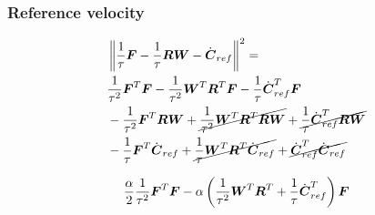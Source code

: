 \subsubsection{Reference velocity}
\begin{equation*}
\begin{split}
    &\norm{\frac{1}{\tau} \FD - \frac{1}{\tau} \M{R} \V{W} - \cVel_{ref}}^2 = \\
    &
    \frac{1}{\tau^2} \FD^T \FD
    - \frac{1}{\tau^2} \V{W}^T \M{R}^T \FD
    - \frac{1}{\tau} \cVel_{ref}^T \FD\\
    &
    - \frac{1}{\tau^2} \FD^T \M{R} \V{W}
    + \cancel{\frac{1}{\tau^2} \V{W}^T \M{R}^T \M{R} \V{W}}
    + \cancel{\frac{1}{\tau} \cVel_{ref}^T \M{R} \V{W}}\\
    &
    - \frac{1}{\tau} \FD^T \cVel_{ref}
    + \cancel{\frac{1}{\tau} \V{W}^T \M{R}^T \cVel_{ref}}
    + \cancel{\cVel_{ref}^T \cVel_{ref}}\\
\end{split}
\end{equation*}

\begin{equation*}
    \frac{\alpha}{2} \frac{1}{\tau^2} \FD^T \FD
    -  
    \alpha 
    \left(
        \frac{1}{\tau^2} \V{W}^T \M{R}^T
        +
        \frac{1}{\tau} \cVel_{ref}^T
    \right)
    \FD
\end{equation*}

